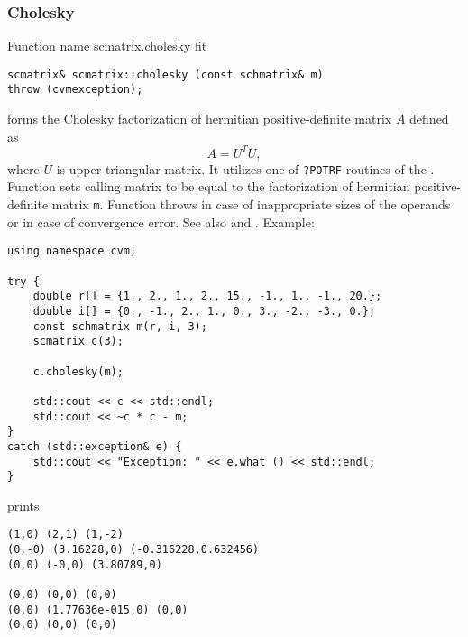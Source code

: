 \subsubsection{Cholesky}
Function%
\pdfdest name {scmatrix.cholesky} fit
\begin{verbatim}
scmatrix& scmatrix::cholesky (const schmatrix& m)
throw (cvmexception);
\end{verbatim}
forms the Cholesky factorization of  hermitian positive-definite 
matrix $A$ defined as
\begin{equation*}
A=U^T U,
\end{equation*}
where $U$ is upper triangular matrix.
It utilizes one of \verb"?POTRF" routines of the
.
Function
sets  calling matrix to be equal to the factorization
of  hermitian
positive-definite matrix \verb"m".
Function throws 
in case of inappropriate sizes of the operands
or in case of convergence error.
See also
 and
.
Example:
\begin{Verbatim}
using namespace cvm;

try {
    double r[] = {1., 2., 1., 2., 15., -1., 1., -1., 20.};
    double i[] = {0., -1., 2., 1., 0., 3., -2., -3., 0.};
    const schmatrix m(r, i, 3);
    scmatrix c(3);

    c.cholesky(m);

    std::cout << c << std::endl;
    std::cout << ~c * c - m;
}
catch (std::exception& e) {
    std::cout << "Exception: " << e.what () << std::endl;
}
\end{Verbatim}
prints
\begin{Verbatim}
(1,0) (2,1) (1,-2)
(0,-0) (3.16228,0) (-0.316228,0.632456)
(0,0) (-0,0) (3.80789,0)

(0,0) (0,0) (0,0)
(0,0) (1.77636e-015,0) (0,0)
(0,0) (0,0) (0,0)
\end{Verbatim}
\newpage


